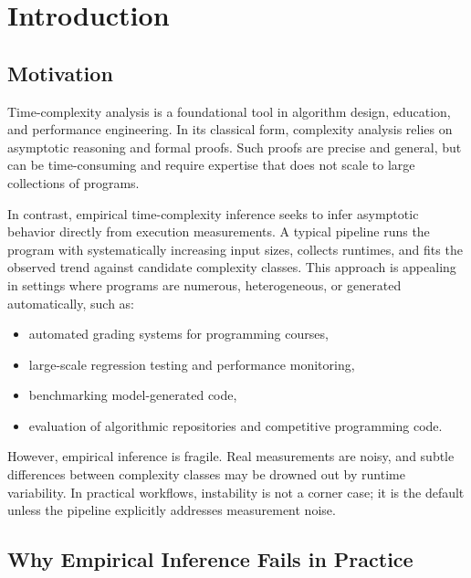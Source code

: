 \documentclass[conference]{IEEEtran}
\begin{document}
\section{Introduction}

\subsection{Motivation}

Time-complexity analysis is a foundational tool in algorithm design,
education, and performance engineering.
In its classical form, complexity analysis relies on asymptotic reasoning and
formal proofs.
Such proofs are precise and general, but can be time-consuming and require
expertise that does not scale to large collections of programs.

In contrast, empirical time-complexity inference seeks to infer asymptotic
behavior directly from execution measurements.
A typical pipeline runs the program with systematically increasing input sizes,
collects runtimes, and fits the observed trend against candidate complexity
classes.
This approach is appealing in settings where programs are numerous,
heterogeneous, or generated automatically, such as:
\begin{itemize}[leftmargin=1.2em]
\item automated grading systems for programming courses,
\item large-scale regression testing and performance monitoring,
\item benchmarking model-generated code,
\item evaluation of algorithmic repositories and competitive programming code.
\end{itemize}

However, empirical inference is fragile.
Real measurements are noisy, and subtle differences between complexity classes
may be drowned out by runtime variability.
In practical workflows, instability is not a corner case; it is the default
unless the pipeline explicitly addresses measurement noise.

\subsection{Why Empirical Inference Fails in Practice}
\end{document}
